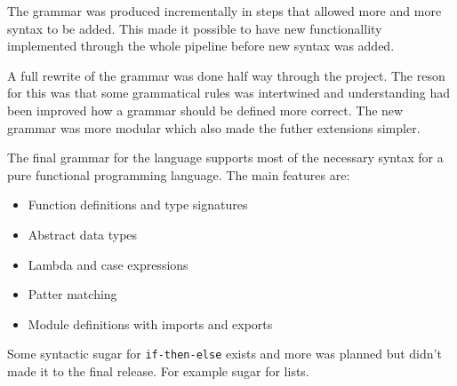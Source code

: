 The grammar was produced incrementally in steps that allowed more and more syntax to be added. This made it possible to have new functionallity implemented through the whole pipeline before new syntax was added. 

A full rewrite of the grammar was done half way through the project. The reson for this was that some grammatical rules was intertwined and understanding had been improved how a grammar should be defined more correct. The new grammar was more modular which also made the futher extensions simpler.

The final grammar for the language supports most of the necessary syntax for a pure functional programming language. The main features are:

\begin{itemize}
  \item Function definitions and type signatures
  \item Abstract data types
  \item Lambda and case expressions
  \item Patter matching
  \item Module definitions with imports and exports
\end{itemize}


Some syntactic sugar for \texttt{if-then-else} exists and more was planned but didn't made it to the final release. For example sugar for lists.%



